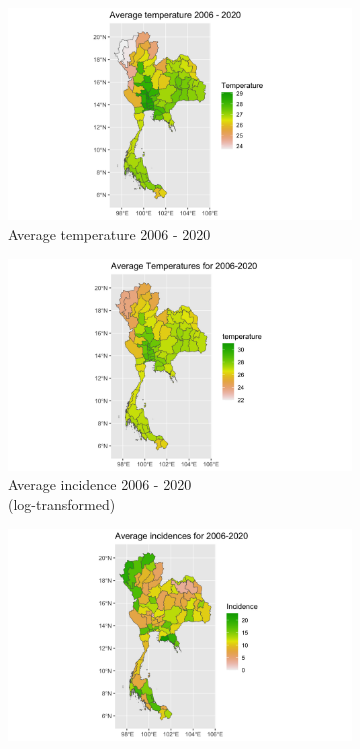 \documentclass[parskip]{scrartcl}
\begin{document}
	\begin{figure}
		
		\centering
		\begin{subfigure}{0.5\textwidth}
	\includegraphics[width=\textwidth]{fig/Average_temperature.png}
			\caption{Average temperature 2006 - 2020}
			\label{fig:av_temp_map}
		\end{subfigure}
		\hfill
		\begin{subfigure}{0.5\textwidth}
			\includegraphics[width=\textwidth]{fig/Average_incidence_log.png}
			\caption{Average incidence 2006 - 2020\\ (log-transformed)}
			\label{fig:av_inc_log}
		\end{subfigure}
		\hfill
		\begin{subfigure}{0.6\textwidth}
			\includegraphics[width=\textwidth]{fig/Average_incidence.png}

\end{subfigure}
\end{figure}
\end{document}
